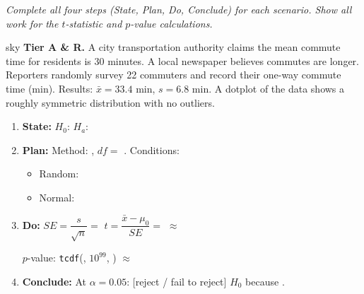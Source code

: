 \documentclass[10pt]{article}
\begin{document}
\namepartnerperiod

\vspace{0.15in}

\textit{Complete all four steps (State, Plan, Do, Conclude) for each scenario. Show all work
for the $t$-statistic and $p$-value calculations.}

\begin{scenariobox}{sky}
\textbf{Tier A \& R.} \quad
A city transportation authority claims the mean commute time for residents is 30 minutes.
A local newspaper believes commutes are longer. Reporters randomly survey 22 commuters and
record their one-way commute time (min). Results: $\bar x = 33.4$ min, $s = 6.8$ min.
A dotplot of the data shows a roughly symmetric distribution with no outliers.

\begin{enumerate}[label=\alph*.]
  \item \textbf{State:} $H_0$: \blank{4cm} \quad $H_a$: \blank{4cm}
  \item \textbf{Plan:} Method: \blank{5cm}, $df = $ \blank{1.5cm}. Conditions:
        \begin{itemize}
          \item Random: \writeline
          \item Normal: \writeline
        \end{itemize}
  \item \textbf{Do:} $SE = \dfrac{s}{\sqrt{n}} = $ \blank{3cm} \quad
        $t = \dfrac{\bar x - \mu_0}{SE} = $ \blank{4cm} $\approx$ \blank{2cm}

        $p$-value: \texttt{tcdf}(\blank{2cm}, $10^{99}$, \blank{2cm}) $\approx$ \blank{2cm}

  \item \textbf{Conclude:} At $\alpha = 0.05$: [reject / fail to reject] $H_0$ because \blank{4cm}.
        \writeline
\end{enumerate}
\end{scenariobox}
\end{document}
